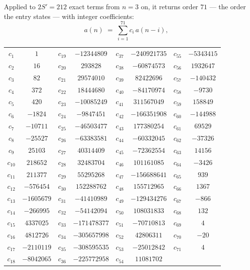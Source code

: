 \documentclass[11pt,a4paper]{article}
\theoremstyle{plain}
\theoremstyle{definition}
\begin{document}
Applied to $2S'=212$ exact terms from $n=3$ on, it returns order $71$ --- the
order the entry states --- with integer coefficients:
\[
a(n)\;=\;\sum_{i=1}^{71}c_i\,a(n-i),
\]
\begin{center}\small
\begin{tabular}{cccccccc}
$c_{1}$ & $1$ & $c_{19}$ & $-12344809$ & $c_{37}$ & $-240921735$ & $c_{55}$ & $-5343415$ \\
$c_{2}$ & $16$ & $c_{20}$ & $293828$ & $c_{38}$ & $-60874573$ & $c_{56}$ & $1932647$ \\
$c_{3}$ & $82$ & $c_{21}$ & $29574010$ & $c_{39}$ & $82422696$ & $c_{57}$ & $-140432$ \\
$c_{4}$ & $372$ & $c_{22}$ & $18444680$ & $c_{40}$ & $-84170974$ & $c_{58}$ & $-9730$ \\
$c_{5}$ & $420$ & $c_{23}$ & $-10085249$ & $c_{41}$ & $311567049$ & $c_{59}$ & $158849$ \\
$c_{6}$ & $-1824$ & $c_{24}$ & $-9847451$ & $c_{42}$ & $-166351908$ & $c_{60}$ & $-144988$ \\
$c_{7}$ & $-10711$ & $c_{25}$ & $-46503477$ & $c_{43}$ & $177380254$ & $c_{61}$ & $69529$ \\
$c_{8}$ & $-25527$ & $c_{26}$ & $-63383581$ & $c_{44}$ & $-60332045$ & $c_{62}$ & $-37326$ \\
$c_{9}$ & $25103$ & $c_{27}$ & $40314409$ & $c_{45}$ & $-72362554$ & $c_{63}$ & $14156$ \\
$c_{10}$ & $218652$ & $c_{28}$ & $32483704$ & $c_{46}$ & $101161085$ & $c_{64}$ & $-3426$ \\
$c_{11}$ & $211377$ & $c_{29}$ & $55295268$ & $c_{47}$ & $-156688641$ & $c_{65}$ & $939$ \\
$c_{12}$ & $-576454$ & $c_{30}$ & $152288762$ & $c_{48}$ & $155712965$ & $c_{66}$ & $1367$ \\
$c_{13}$ & $-1605679$ & $c_{31}$ & $-41410989$ & $c_{49}$ & $-129434276$ & $c_{67}$ & $-866$ \\
$c_{14}$ & $-266995$ & $c_{32}$ & $-54142094$ & $c_{50}$ & $108031833$ & $c_{68}$ & $132$ \\
$c_{15}$ & $4337025$ & $c_{33}$ & $-171478377$ & $c_{51}$ & $-70710813$ & $c_{69}$ & $4$ \\
$c_{16}$ & $4812726$ & $c_{34}$ & $-305657998$ & $c_{52}$ & $42806311$ & $c_{70}$ & $-20$ \\
$c_{17}$ & $-2110119$ & $c_{35}$ & $-308595535$ & $c_{53}$ & $-25012842$ & $c_{71}$ & $4$ \\
$c_{18}$ & $-8042065$ & $c_{36}$ & $-225772958$ & $c_{54}$ & $11081702$ &  &  \\
\end{tabular}
\end{center}
\end{document}
